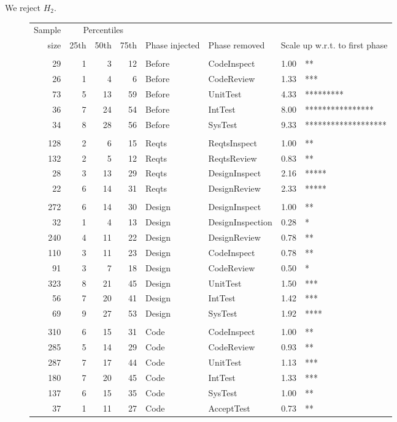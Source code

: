 \documentclass{sig-alternate}
\def\baselinestretch{1}
\begin{document}
We reject $H_2$.




\begin{figure}[!t] 
 \renewcommand{\baselinestretch}{0.7}
 \scriptsize
\begin{center}
\begin{tabular}{r|rrr|ll|rl}
  Sample&\multicolumn{3}{c|}{Percentiles}\\ 
size & 25th & 50th & 75th & Phase injected & Phase removed & \multicolumn{2}{l}{Scale up w.r.t. to first phase}\\\hline
\\
  29 &     1 &     3 &    12 & Before & CodeInspect  & 1.00  &  **  \\
  26 &     1 &     4 &     6 & Before & CodeReview  & 1.33  &  ***  \\
  73 &     5 &    13 &    59 & Before & UnitTest  & 4.33  &  *********  \\
  36 &     7 &    24 &    54 & Before & IntTest  & 8.00  &  ****************  \\
  34 &     8 &    28 &    56 & Before & SysTest  & 9.33  &  *******************  \\\hline
\\
128 &     2 &     6 &    15 & Reqts & ReqtsInspect  & 1.00  &  **  \\
132 &     2 &     5 &    12 & Reqts & ReqtsReview  & 0.83  &  **  \\
 28 &     3 &    13 &    29 & Reqts & DesignInspect  & 2.16  &  *****  \\
 22 &     6 &    14 &    31 & Reqts & DesignReview  & 2.33  &  *****  \\\hline
\\
272 &     6 &    14 &    30 & Design & DesignInspect  & 1.00  &  **  \\
 32 &     1 &     4 &    13 & Design & DesignInspection  & 0.28  &  *  \\
240 &     4 &    11 &    22 & Design & DesignReview  & 0.78  &  **  \\
110 &     3 &    11 &    23 & Design & CodeInspect  & 0.78  &  **  \\
 91 &     3 &     7 &    18 & Design & CodeReview  & 0.50  &  *  \\
323 &     8 &    21 &    45 & Design & UnitTest  & 1.50  &  ***  \\
 56 &     7 &    20 &    41 & Design & IntTest  & 1.42  &  ***  \\
 69 &     9 &    27 &    53 & Design & SysTest  & 1.92  &  ****  \\\hline
\\
310 &     6 &    15 &    31 & Code & CodeInspect  & 1.00  &  **  \\
285 &     5 &    14 &    29 & Code & CodeReview  & 0.93  &  **  \\
287 &     7 &    17 &    44 & Code & UnitTest  & 1.13  &  ***  \\
180 &     7 &    20 &    45 & Code & IntTest  & 1.33  &  ***  \\
137 &     6 &    15 &    35 & Code & SysTest  & 1.00  &  **  \\
 37 &     1 &    11 &    27 & Code & AcceptTest  & 0.73  &  **  \\


\end{tabular}
\end{center}
\end{figure}
\end{document}
